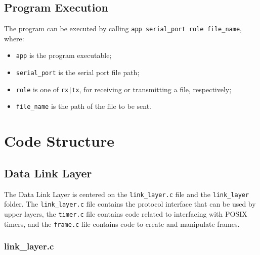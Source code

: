 \documentclass[11pt,a4paper,twocolumn]{article}
\begin{document}
\subsection{Program Execution}

The program can be executed by calling \lstinline{app serial_port role file_name}, where:

\begin{itemize}
    \item \lstinline{app} is the program executable;
    \item \lstinline{serial_port} is the serial port file path;
    \item \lstinline{role} is one of \lstinline{rx|tx}, for receiving or transmitting a file, respectively;
    \item \lstinline{file_name} is the path of the file to be sent.
\end{itemize}

\section{Code Structure}

\subsection{Data Link Layer}
\label{sec:dll}

The Data Link Layer is centered on the \lstinline{link_layer.c} file and the \lstinline{link_layer} folder.
The \lstinline{link_layer.c} file contains the protocol interface that can be used by upper layers, the \lstinline{timer.c} file contains code related to interfacing with POSIX timers, and the \lstinline{frame.c} file contains code to create and manipulate frames.

\subsubsection{link\_layer.c}
\end{document}
